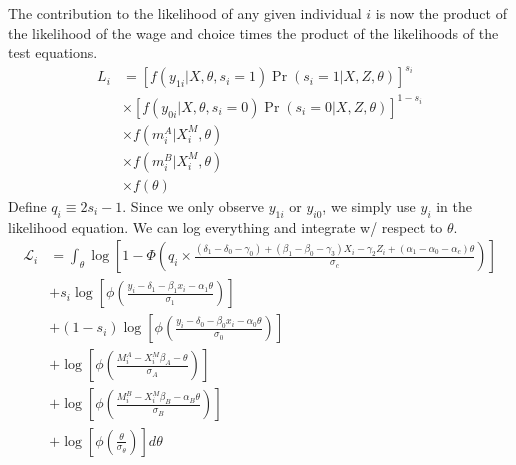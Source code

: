 \documentclass[11pt,letterpaper]{article}
\begin{document}
The contribution to the likelihood of any given individual $i$ is now the product of the likelihood of the wage and choice times the product of the likelihoods of the test equations.
\begin{align*}
L_i &= 
	         \left[f(y_{1i}|X,\theta,s_i=1)\Pr(s_i=1|X,Z,\theta)\right]^{s_i} \\
	& \times \left[f(y_{0i}|X,\theta,s_i=0)\Pr(s_i=0|X,Z,\theta)\right]^{1-s_i} \\
	& \times f(m^A_i|X_i^M,\theta) \\
	& \times f(m^B_i|X_i^M,\theta) \\
	& \times f(\theta)
\end{align*}
Define $q_i \equiv 2s_i - 1$. Since we only observe $y_{1i}$ or $y_{i0}$, we simply use $y_i$ in the likelihood equation. We can log everything and integrate w/ respect to $\theta$. 
\begin{align*}
\mathcal L_i 
	&= \int_\theta \log \left[1 - \Phi\left(
		q_i \times \frac{(\delta_1 - \delta_0 - \gamma_0) + (\beta_1 - \beta_0 - \gamma_3)X_i - \gamma_2 Z_i + (\alpha_1 - \alpha_0 - \alpha_c)\theta}{\sigma_c} 
		\right) \right] \\
	&+    s_i  \log\left[\phi\left( \frac{y_i - \delta_1 - \beta_1 x_i - \alpha_1 \theta}{\sigma_1} \right) \right] \\
	&+ (1-s_i) \log\left[\phi\left( \frac{y_i - \delta_0 - \beta_0 x_i - \alpha_0 \theta}{\sigma_0} \right) \right] \\
	&+ \log\left[\phi\left(\frac{M_i^A - X^M_i\beta_A - \theta        }{\sigma_A} \right)\right] \\
	&+ \log\left[\phi\left(\frac{M_i^B - X^M_i\beta_B - \alpha_B\theta}{\sigma_B} \right)\right] \\
	&+ \log\left[\phi\left(\frac{\theta}{\sigma_\theta}\right)\right] d\theta
\end{align*}
\end{document}
